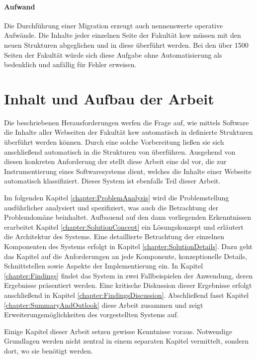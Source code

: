         \paragraph{Aufwand}
        Die Durchführung einer Migration erzeugt auch nennenswerte operative Aufwände.
        Die Inhalte jeder einzelnen Seite der Fakultät \gls{ksw} müssen
        mit den neuen Strukturen abgeglichen und in diese überführt werden.
        Bei den über 1500 Seiten der Fakultät
        würde sich diese Aufgabe ohne Automatisierung als bedenklich und anfällig für Fehler erweisen.

    \section{Inhalt und Aufbau der Arbeit}
        Die beschriebenen Herausforderungen
        werfen die Frage auf, wie mittels Software die Inhalte aller Webseiten der Fakultät \gls{ksw}
        automatisch in definierte Strukturen überführt werden können.
        Durch eine solche Vorbereitung ließen sie sich anschließend
        automatisch in die Strukturen von {\imperia} überführen.
        Ausgehend von diesen konkreten Anforderung der {\fernUni} stellt diese Arbeit eine
        \gls{dsl} vor, die zur Instrumentierung eines Softwaresystems dient,
        welches die Inhalte einer Webseite automatisch klassifiziert.
        Dieses System ist ebenfalls Teil dieser Arbeit.

        Im folgenden Kapitel \ref{chapter:ProblemAnalysis} wird die Problemstellung ausführlicher
        analysiert und spezifiziert, was auch die Betrachtung der Problemdomäne beinhaltet.
        Aufbauend auf den dann vorliegenden Erkenntnissen erarbeitet
        Kapitel \ref{chapter:SolutionConcept}
        ein Lösungskonzept und erläutert die Architektur des Systems.
        Eine detaillierte Betrachtung der einzelnen Komponenten des Systems
        erfolgt in Kapitel \ref{chapter:SolutionDetails}.
        Dazu geht das Kapitel auf die Anforderungen an jede Komponente,
        konzeptionelle Details, Schnittstellen sowie Aspekte der Implementierung ein.       
        In Kapitel \ref{chapter:Findings} findet das System in zwei Fallbeispielen der {\fernUni}
        Anwendung, deren Ergebnisse präsentiert werden.
        Eine kritische Diskussion dieser Ergebnisse erfolgt anschließend in
        Kapitel \ref{chapter:FindingsDiscussion}.
        Abschließend fasst Kapitel \ref{chapter:SummaryAndOutlook}
        diese Arbeit zusammen und zeigt Erweiterungsmöglichkeiten
        des vorgestellten Systems auf.

        Einige Kapitel dieser Arbeit setzen gewisse Kenntnisse voraus.
        Notwendige Grundlagen werden nicht zentral in einem separaten Kapitel vermittelt,
        sondern dort, wo sie benötigt werden.
